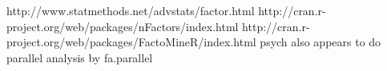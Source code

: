 \documentclass{article}\usepackage[]{graphicx}\usepackage[]{color}
\begin{document}



http://www.statmethods.net/advstats/factor.html
http://cran.r-project.org/web/packages/nFactors/index.html
http://cran.r-project.org/web/packages/FactoMineR/index.html
psych also appears to do parallel analysis by fa.parallel
\end{document}
